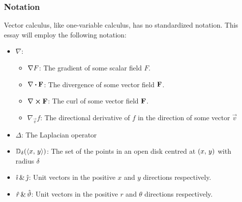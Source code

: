 \subsubsection{Notation}
Vector calculus, like one-variable calculus, has no standardized notation. This essay will employ the following
notation:
\begin{itemize}
	\item $\nabla$:
	\begin{itemize}
		\item $\nabla F$: The gradient of some scalar field $F$.
		\item $\divergence{\fatf}$: The divergence of some vector field $\mathbf{F}$.
		\item $\curl{\fatf}$: The curl of some vector field $\mathbf{F}$.
		\item $\nabla_\vec{v}f$: The directional derivative of $f$ in the direction of some vector $\vec{v}$
	\end{itemize}
	\item $\Delta$: The Laplacian operator
	\item $\mathbb{D}_\delta(\langle x,\,y\rangle)$: The set of the points in an open disk centred at $(x,\,y)$ with radius $\delta$
	\item $\hat{\imath}\,\&\,\hat{\jmath}$: Unit vectors in the positive $x$ and $y$ directions respectively.
	\item $\hat{r}\,\&\,\hat{\vartheta}$: Unit vectors in the positive $r$ and $\theta$ directions respectively.
\end{itemize}